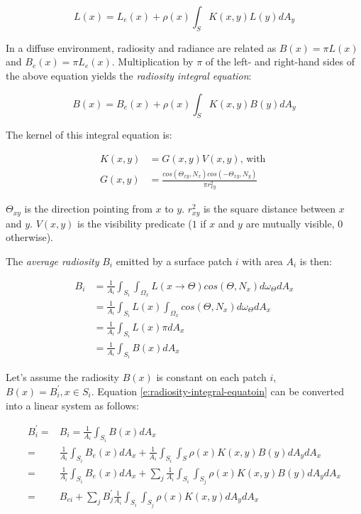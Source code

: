 \begin{equation*}
	L(x)=L_e(x)+\rho(x)\int_{S}K(x,y)L(y)dA_y
\end{equation*}

In a diffuse environment, radiosity and radiance are related as $B(x)=\pi L(x)$ and $B_e(x)=\pi L_e(x)$. Multiplication by $\pi$ of the left- and right-hand sides of the above equation yields the \textit{radiosity integral equation}:

\begin{equation}\label{e:radiosity-integral-equatoin}
	B(x)=B_e(x)+\rho(x)\int_S K(x,y)B(y)dA_y
\end{equation}

The kernel of this integral equation is:

\begin{equation*}
\begin{aligned}
	K(x,y)&=G(x,y)V(x,y) \text{, with }\\
		G(x,y)&=\frac{cos(\Theta_{xy},N_x)cos(-\Theta_{xy},N_y)}{\pi r^{2}_{xy}}
\end{aligned}
\end{equation*}

$\Theta_{xy}$ is the direction pointing from $x$ to $y$. $r^{2}_{xy}$ is the square distance between $x$ and $y$. $V(x,y)$ is the visibility predicate ($1$ if $x$ and $y$ are mutually visible, $0$ otherwise).

The \textit{average radiosity} $B_i$ emitted by a surface patch $i$ with area $A_i$ is then:

\begin{equation}\label{e:average-radiosity}
	\begin{aligned}
		B_i&=\frac{1}{A_i}\int_{S_i} \int_{\Omega_x} L(x\to\Theta)cos(\Theta,N_x)d\omega_\Theta dA_x\\
		   &=\frac{1}{A_i}\int_{S_i}L(x) \int_{\Omega_x} cos(\Theta,N_x)d\omega_\Theta dA_x\\
		   &=\frac{1}{A_i}\int_{S_i}L(x)\pi dA_x\\
		   &=\frac{1}{A_i}\int_{S_i}B(x)dA_x
	\end{aligned}
\end{equation}

Let's assume the radiosity $B(x)$ is constant on each patch $i$, $B(x)=B^{'}_{i},x\in S_i$. Equation \ref{e:radiosity-integral-equatoin} can be converted into a linear system as follows:

\begin{equation*}
\begin{aligned}
	B_{i}^{'}=&B_i=\frac{1}{A_i}\int_{S_i}B(x)dA_x\\
			 =&\frac{1}{A_i}\int_{S_i}B_e(x)dA_x+\frac{1}{A_i}\int_{S_i}\int_S \rho (x)K(x,y)B(y)dA_ydA_x\\	
			 =&\frac{1}{A_i}\int_{S_i}B_e(x)dA_x+\sum_j \frac{1}{A_i}\int_{S_i}\int_{S_j} \rho (x)K(x,y)B(y)dA_ydA_x\\
			 =&B_{ei}+\sum_j B_{j}^{'}\frac{1}{A_i}\int_{S_i}\int_{S_j} \rho (x)K(x,y)dA_ydA_x
\end{aligned}
\end{equation*}

